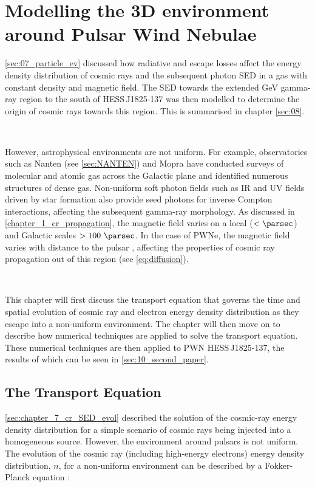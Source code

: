 \chapter{Modelling the 3D environment around Pulsar Wind Nebulae} \label{sec:09_multizone}

\autoref{sec:07_particle_ev} discussed how radiative and escape losses affect the energy density distribution of cosmic rays and the subsequent photon SED in a gas with constant density and magnetic field. The SED towards the extended GeV gamma-ray region to the south of \mbox{HESS\,J1825-137} was then modelled to determine the origin of cosmic rays towards this region. This is summarised in chapter \autoref{sec:08}.
\par~\par
However, astrophysical environments are not uniform. For example, observatories such as Nanten (see \autoref{sec:NANTEN}) and Mopra \citep{2018PASA...35...29B} have conducted surveys of molecular and atomic gas across the Galactic plane and identified numerous structures of dense gas. Non-uniform soft photon fields such as IR and UV fields driven by star formation also provide seed photons for inverse Compton interactions, affecting the subsequent gamma-ray morphology. As discussed in \autoref{chapter_1_cr_propagation}, the magnetic field varies on a local ($<\pc$) and Galactic scales $>100~\pc$. In the case of PWNe, the magnetic field varies with distance to the pulsar \citep{2012SSRv..166..231R}, affecting the properties of cosmic ray propagation out of this region (see \autoref{eq:diffusion}).
\par~\par
This chapter will first discuss the transport equation that governs the time and spatial evolution of cosmic ray and electron energy density distribution as they escape into a non-uniform environment. The chapter will then move on to describe how numerical techniques are applied to solve the transport equation. These numerical techniques are then applied to PWN \mbox{HESS\,J1825-137}, the results of which can be seen in \autoref{sec:10_second_paper}.

\section{The Transport Equation} \label{sec:09_Transport_multizone_diffusion}

\autoref{sec:chapter_7_cr_SED_evol} described the solution of the cosmic-ray energy density distribution for a simple scenario of cosmic rays being injected into a homogeneous source. However, the environment around pulsars is not uniform. The evolution of the cosmic ray (including high-energy electrons) energy density distribution, $n$, for a non-uniform environment can be described by a Fokker-Planck equation \citep{1975MNRAS.172..557S,1978A&A....70..367C}:

